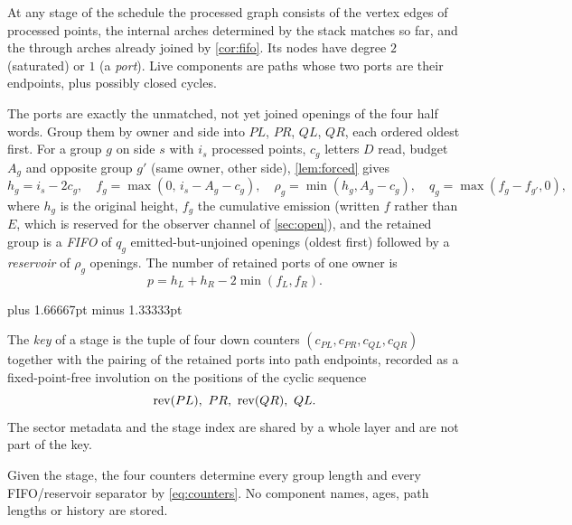 At any stage of the schedule the processed graph consists of the vertex edges
of processed points, the internal arches determined by the stack matches so
far, and the through arches already joined by \cref{cor:fifo}. Its nodes have
degree $2$ (saturated) or $1$ (a \emph{port}). Live components are paths whose
two ports are their endpoints, plus possibly closed cycles.

The ports are exactly the unmatched, not yet joined openings of the four
half words. Group them by owner and side into $PL$, $PR$, $QL$, $QR$, each
ordered oldest first. For a group $g$ on side $s$ with $i_s$ processed points,
$c_g$ letters $D$ read, budget $A_g$ and opposite group $g'$ (same owner, other
side), \cref{lem:forced} gives
\begin{equation}
\label{eq:counters}
 h_g=i_s-2c_g,\quad f_g=\max(0,\,i_s-A_g-c_g),\quad
 \rho_g=\min(h_g,A_g-c_g),\quad q_g=\max(f_g-f_{g'},0),
\end{equation}
where $h_g$ is the original height, $f_g$ the cumulative emission (written $f$ rather than $E$, which is reserved for the observer channel of \cref{sec:open}), and the
retained group is a \emph{FIFO} of $q_g$ emitted-but-unjoined openings (oldest
first) followed by a \emph{reservoir} of $\rho_g$ openings. The number of
retained ports of one owner is
\begin{equation}
\label{eq:ports}
 p=h_{L}+h_{R}-2\min(f_L,f_R).
\end{equation}

\begingroup
\spaceskip=3.33333pt plus 1.66667pt minus 1.33333pt
\begin{definition}
\label{def:key}
\leanok
{}
The \emph{key} of a stage is the tuple of four down counters
$(c_{PL},c_{PR},c_{QL},c_{QR})$ together with the pairing of the retained
ports into path endpoints, recorded as a fixed-point-free involution on the
positions of the cyclic sequence
\[
 \operatorname{rev}(PL),\ PR,\ \operatorname{rev}(QR),\ QL .
\]
The sector metadata and the stage index are shared by a whole layer and are
not part of the key.
\end{definition}
\endgroup

Given the stage, the four counters determine every group length and every
FIFO/reservoir separator by \eqref{eq:counters}. No component names, ages,
path lengths or history are stored.

